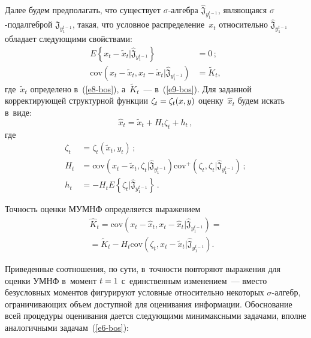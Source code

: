 \begin{multicols}{2}
    Далее будем предполагать, что существует $\sigma$-ал\-геб\-ра 
$\hat{\mathfrak{J}}_{y_1^{t-1}}$, являющаяся $\sigma$-под\-ал\-геб\-рой 
$\mathfrak{J}_{y_1^{t-1}}$, такая, что условное 
распределение~$x_t$ относительно $\hat{\mathfrak{J}}_{y_1^{t-1}}$ обладает 
следующими свойствами: 
\begin{align*}
E\left\{x_t- \tilde{x}_t\vert \hat{\mathfrak{J}}_{y_1^{t-1}}\right\}&=0\,;\\
\mathrm{cov}\left (x_t- \tilde{x}_t, x_t- 
\tilde{x}_t\vert \hat{\mathfrak{J}}_{y_1^{t-1}}\right)&=\tilde{K}_t,
\end{align*} 
где~$\tilde{x}_t$ определено в~(\ref{e8-bos}), а~$\tilde{K}_t$~--- в~(\ref{e9-bos}). Для 
заданной корректирующей структурной функции $\zeta_t\hm= \zeta_t(x,y)$ 
оценку~$\hat{x}_t$ будем искать в~виде:
    \begin{equation}
    \hat{x}_t=\tilde{x}_t+H_t\zeta_t + h_t\,,
        \label{e10-bos}
    \end{equation}
    где
\begin{align*}
\zeta_t&=\zeta_t \left( \tilde{x}_t,  y_t\right)\,;\\
    H_t&= \mathrm{cov}\left( x_t-\tilde{x}_t,\zeta_t\vert \hat{\mathfrak{J}}_{y_1^{t-
1}}\right) \mathrm{cov}^+ \left( \zeta_t, \zeta_t\vert\hat{\mathfrak{J}}_{y_1^{t-1}}
\right)\,;\\ 
h_t&=-H_tE\left\{ \zeta_t\vert \hat{\mathfrak{J}}_{y_1^{t-1}}\right\}\,.
       \end{align*}
    
    Точность оценки МУМНФ определяется выражением
    \begin{multline}
    \hat{K}_t=\mathrm{cov}\left( x_t-\hat{x}_t, x_t-\hat{x}_t\vert 
\hat{\mathfrak{J}}_{y_1^{t-1}}\right) ={}\\
{}=\tilde{K}_t-H_t \mathrm{cov} \left( \zeta_t, x_t-
\tilde{x}_t\vert \hat{\mathfrak{J}}_{y_1^{t-1}}\right).
    \label{e11-bos}
    \end{multline}
    
    Приведенные соотношения, по сути, в~точ\-ности повторяют выражения для 
оценки УМНФ в~момент $t\hm=1$ с~единственным изменением~--- вместо 
безусловных моментов фигурируют услов\-ные относительно некоторых 
$\sigma$-ал\-гебр, огра\-ни\-чивающих объем доступной для оценивания\linebreak 
информации. Обосно\-ва\-ние всей процедуры оценивания дается следующими 
минимаксными задачами, вполне аналогичными задачам~(\ref{e6-bos}):


\end{multicols}
